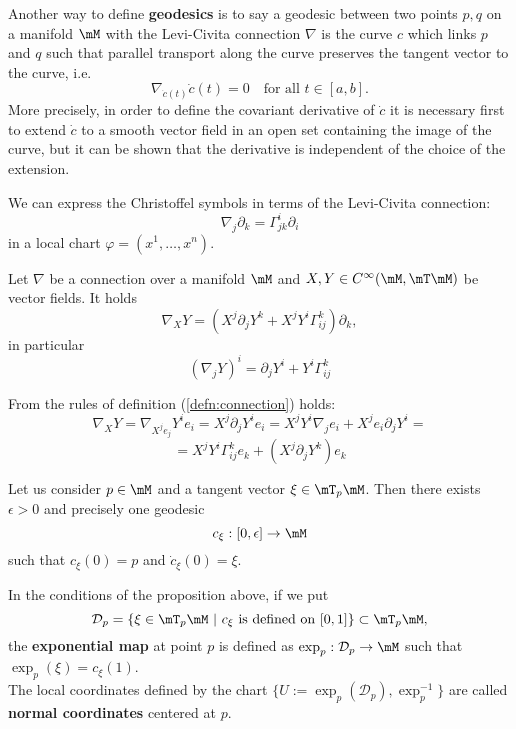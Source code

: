 Another way to define \textbf{geodesics} is to say a geodesic between two points $p,q$ on a manifold $\mM$ with the Levi-Civita connection $\nabla$ is the curve $c$ which links $p$ and $q$ such that parallel transport along the curve preserves the tangent vector to the curve, i.e.
\begin{equation}
	\nabla_{\dot{c}(t)}\dot{c}(t)=0\quad \text{for all } t\in [a,b].
	\label{eq:LCgeodesic}
\end{equation}
More precisely, in order to define the covariant derivative of $\displaystyle \dot {c }$ it is necessary first to extend $\displaystyle \dot {c }$ to a smooth vector field in an open set containing the image of the curve, but it can be shown that the derivative is independent of the choice of the extension.\\

\begin{oss}
	We can express the Christoffel symbols in terms of the Levi-Civita connection:
	\begin{equation}
			\nabla_{j}\partial_k=\Gamma_{jk}^i \partial_i
			\label{eq:LCchrist}
	\end{equation}
in a local chart $\varphi=(x^1,\dots,x^n)$.
\end{oss}

\begin{prop}
	Let $\nabla$ be a connection over a manifold $\mM$ and $X,Y\in C^\infty(\mM,\mT\mM)$ be vector fields. It holds
	\[	\nabla_X Y=\left(X^j\partial_jY^k+X^jY^i\Gamma_{ij}^k\right)\partial_k,		\]
	in particular
	\[	(\nabla_j Y)^i=\partial_jY^i+Y^i\Gamma_{ij}^k		\]
\end{prop}
\Proof From the rules of definition (\ref{defn:connection}) holds:
\[	\nabla_X Y=\nabla_{X^je_j}Y^i e_i=X^j\partial_j Y^i e_i=X^jY^i\nabla_j e_i+X^j e_i\partial_j Y^i=		\]
\[	=X^jY^i\Gamma_{ij}^k e_k+(X^j\partial_jY^k) e_k		\]


\begin{prop}
	Let us consider $p\in\mM$ and a tangent vector $\xi\in \mT_p\mM$. Then there exists $\epsilon>0$ and precisely one geodesic $$c_\xi:[0,\epsilon]\to\mM$$ such that $c_\xi(0)=p$ and $\dot c_\xi(0)=\xi$.
\end{prop}

\begin{definition}
	In the conditions of the proposition above, if we put
	\[		\mathcal{D}_p=\{	\xi\in\mT_p\mM\ |\ c_\xi \text{ is defined on } [0,1]	\}\subset \mT_p\mM,	\]
	the \textbf{exponential map} at point $p$ is defined as $\exp_p:\mathcal{D}_p\to\mM$ such that $\exp_p(\xi)=c_\xi(1)$.\\
	The local coordinates defined by the chart $\{U:=\exp_p(\mathcal{D}_p),\exp_p^{-1} \}$ are called \textbf{normal coordinates} centered at $p$.
\end{definition}

